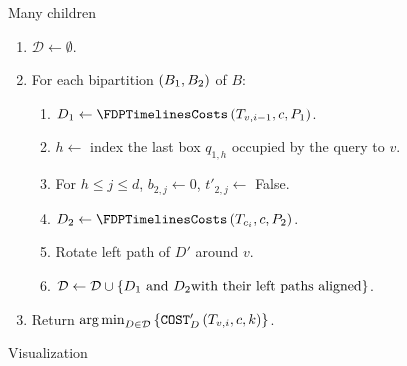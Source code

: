 \begin{frame}{Many children}
    \begin{enumerate}
        \item $\mathcal{D}\gets\emptyset$.
        \item For each bipartition $\left( B_1, B_2 \right)$ of $B$:
        \begin{enumerate}
            \item $D_1\gets \FDPTimelinesCosts\br{T_{v, i-1}, c, P_1}$.

            \item $h\gets$ index the last box $q_{1,h}$ occupied by the query to $v$.

            \item For $h\leq j\leq d$, $b_{2,j}\gets 0$, $t'_{2,j}\gets $ False.

            \item $D_2\gets \FDPTimelinesCosts\br{T_{c_i}, c, P_2}$.

            \item Rotate left path of $D'$ around $v$.

            \item $\mathcal{D}\gets\mathcal{D}\cup\left\{ D_1 \text{ and } D_2 \text{with their left paths aligned} \right\}$.
        \end{enumerate}
        \item Return $\operatorname*{arg\,min}_{D\in \mathcal{D}}\left\{ \texttt{COST}'_D\left( T_{v,i},c, k \right) \right\}$.
    \end{enumerate}
\end{frame}

\begin{frame}{Visualization}
    
\end{frame}
